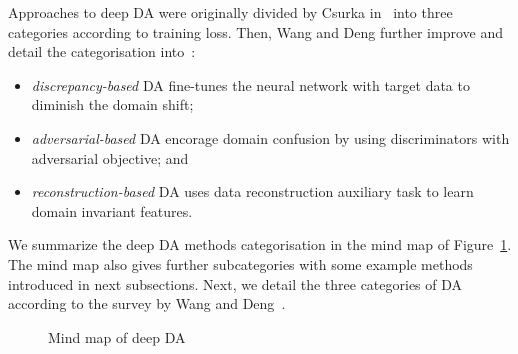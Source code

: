 Approaches to deep DA were originally divided by Csurka in~\cite{csurka2017}
into three categories according to training loss.
Then, Wang and Deng further improve and detail the categorisation into~\cite{wang2018}:

\begin{itemize}
	\item \textit{discrepancy-based} DA fine-tunes the neural network
		with target data to diminish the domain shift;
	\item \textit{adversarial-based} DA encorage domain confusion
		by using discriminators with adversarial objective; and
	\item \textit{reconstruction-based} DA uses data reconstruction auxiliary task to learn domain invariant features.
\end{itemize}

We summarize the deep DA methods categorisation in the mind map of Figure~\ref{mind_map}.
The mind map also gives further subcategories with some example methods
introduced in next subsections.
Next, we detail the three categories of DA according to the survey by Wang and Deng~\cite{wang2018}.

\begin{figure}
	\caption{Mind map of deep DA}
	\label{mind_map}
\end{figure}

